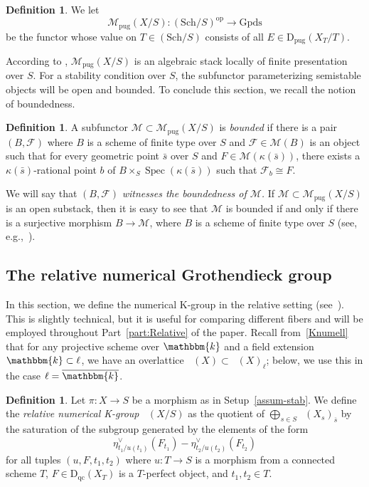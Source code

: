 \documentclass[11pt, reqno]{amsart}
\numberwithin{equation}{section}
\theoremstyle{plain}
\theoremstyle{remark}
\theoremstyle{definition}
\newtheorem{definition}[theorem]{Definition}
\theoremstyle{italicsname}
\newcommand{\Dqc}{\mathrm{D}_{\mathrm{qc}}}
\newcommand{\Dpug}{\mathrm{D_{pug}}}
\newcommand{\num}{\mathrm{num}}
\DeclareMathOperator{\Knum}{\rK_{\num}}
\DeclareMathOperator{\Spec}{Spec}
\newcommand{\cF}{\mathcal{F}}
\newcommand{\cM}{\mathcal{M}}
\newcommand{\rK}{\mathrm{K}}
\newcommand{\KK}{\mathbbm{k}}
\begin{document}
\begin{definition}\label{def:Mpug}
We let
\[
\cM_{\mathrm{pug}}(X/S)\colon (\mathrm{Sch}/S)^{\mathrm{op}}\to \mathrm{Gpds}
\]
be the functor whose value on $T\in(\mathrm{Sch}/S)$ consists of all $E\in \Dpug(X_T/T)$.
\end{definition}

According to \cite{lieblich:moduli-of-complex}, $\cM_{\mathrm{pug}}(X/S)$ is an algebraic stack locally of finite presentation over $S$.
For a stability condition over $S$, the subfunctor parameterizing semistable objects will be open and bounded. To conclude this section, we recall the notion of boundedness.

\begin{definition}
A subfunctor $\cM\subset\cM_{\mathrm{pug}}(X/S)$ is \emph{bounded} if there is a pair $(B,\cF)$ where $B$ is a scheme of finite type over $S$ and $\cF\in \cM(B)$ is an object such that for every geometric point $\bar{s}$ over $S$ and $F\in \cM(\kappa(\bar{s}))$, there exists a $\kappa(\bar{s})$-rational point $b$ of $B\times_S \Spec(\kappa(\bar{s}))$ such that $\cF_b\cong F$. 
\end{definition}

We will say that $(B,\cF)$ \emph{witnesses the boundedness of $\cM$.}
If $\cM\subset \cM_{\mathrm{pug}}(X/S)$ is an open substack, then it is easy to see that $\cM$ is bounded if and only if there is a surjective morphism $B\to \cM$, where $B$ is a scheme of finite type over $S$ (see, e.g.,~\cite[Lemma 9.5]{stability-families}).

\subsection{The relative numerical Grothendieck group}\label{subsec:RelativeKnum}

In this section, we define the numerical K-group in the relative setting (see~\cite[Definition 21.1]{stability-families}). 
This is slightly technical, but it is useful for comparing different fibers and will be employed throughout Part~\ref{part:Relative} of the paper. 
Recall from~\eqref{Knumell} that for any projective scheme over $\KK$ and a field extension $\KK \subset \ell$, we have an overlattice $\Knum(X) \subset \Knum(X)_{\ell}$; below, we use this in the case $\ell = \overline{\KK}$. 

\begin{definition}\label{def:RelativeGrothendieckGroup}
Let $\pi \colon X\to S$ be a morphism as in Setup~\ref{assum-stab}. 
We define the \emph{relative numerical K-group} $\Knum(X/S)$ as the quotient of $\bigoplus_{s\in S} \Knum(X_s)_{\overline{s}}$ by the saturation of the subgroup generated by the elements of the form
\begin{equation}\label{eq:RelativeGrothendieckGroup}
\eta^{\vee}_{t_1/u(t_1)}(F_{t_1})-\eta^{\vee}_{t_2/u(t_2)}(F_{t_2})
\end{equation}
for all tuples $(u,F,t_1,t_2)$ where $u\colon T\to S$ is a morphism from a connected scheme $T$, \mbox{$F\in\Dqc(X_T)$} is a $T$-perfect object, and $t_1,t_2\in T$.
\end{definition}
\end{document}
